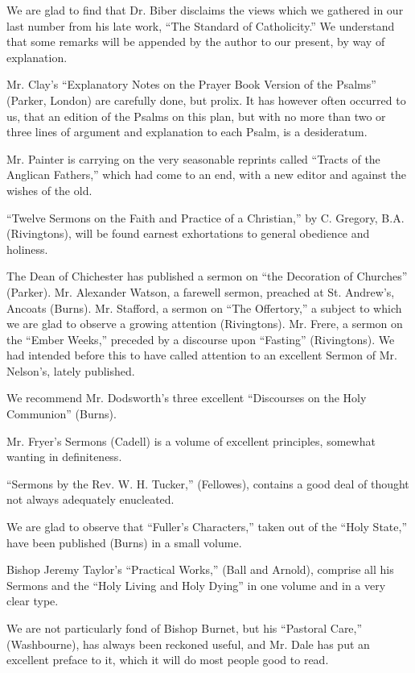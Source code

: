 We are glad to find that Dr. Biber disclaims the
views which we gathered in our last number from his late work, ``The
Standard of Catholicity.'' We understand that some remarks will be
appended by the author to our present, by way of explanation.

Mr. Clay's ``Explanatory Notes on the Prayer Book
Version of the Psalms'' (Parker, London) are carefully done, but prolix.
It has however often occurred to us, that an edition of the Psalms on
this plan, but with no more than two or three lines of argument and
explanation to each Psalm, is a desideratum.

Mr. Painter is carrying on the very seasonable
reprints called ``Tracts of the Anglican Fathers,'' which had come to an
end, with a new editor and against the wishes of the old.

``Twelve Sermons on the Faith and Practice of a
Christian,'' by C. Gregory, B.A. (Rivingtons), will be found earnest
exhortations to general obedience and holiness.

The Dean of Chichester has published a sermon on ``the
Decoration of Churches'' (Parker). Mr. Alexander Watson, a farewell
sermon, preached at St. Andrew's, Ancoats (Burns). Mr. Stafford, a
sermon on ``The Offertory,'' a subject to which we are glad to observe a
growing attention (Rivingtons). Mr. Frere, a sermon on the ``Ember Weeks,''
preceded by a discourse upon ``Fasting'' (Rivingtons). We had intended
before this to have called attention to an excellent Sermon of Mr.
Nelson's, lately published.

We recommend Mr. Dodsworth's three excellent ``Discourses
on the Holy Communion'' (Burns).

Mr. Fryer's Sermons (Cadell) is a volume of
excellent principles, somewhat wanting in definiteness.

``Sermons by the Rev. W. H. Tucker,'' (Fellowes),
contains a good deal of thought not always adequately enucleated.

We are glad to observe that ``Fuller's Characters,''
taken out of the ``Holy State,'' have been published (Burns) in a small
volume.

Bishop Jeremy Taylor's ``Practical Works,'' (Ball and
Arnold), comprise all his Sermons and the ``Holy Living and Holy Dying''
in one volume and in a very clear type.

We are not particularly fond of Bishop Burnet, but
his ``Pastoral Care,'' (Washbourne), has always been reckoned useful, and
Mr. Dale has put an excellent preface to it, which it will do most
people good to read.

